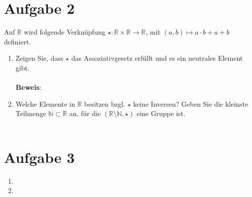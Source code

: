 \documentclass[11pt,a4paper,ngerman]{article}
\newcommand{\N}{\mathbb{N}}
\newcommand{\R}{\mathbb{R}}
\begin{document}
\section*{Aufgabe 2}

Auf $\R$ wird folgende Verknüpfung $\star : \R \times \R \to \R$, mit $(a,b) \mapsto a \cdot b + a + b$ definiert.

\begin{enumerate}[\bfseries a)]

\item Zeigen Sie, dass $\star$ das Assoziativgesetz erfüllt und es ein neutrales Element gibt.
\\ \\
\textbf{Beweis}: \\

\item Welche Elemente in $\R$ besitzen bzgl. $\star$ keine Inversen? Geben Sie die kleinste Teilmenge $\N \subset \R$ an, für die $(\R \setminus \N,\star)$ eine Gruppe ist.
\\ \\

\end{enumerate}

\section*{Aufgabe 3}
\begin{enumerate}[\bfseries a)]
\item

\item

\end{enumerate}
\end{document}
